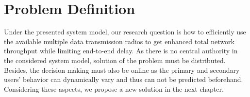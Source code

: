 \section{Problem Definition}

Under the presented system model, our research question is how to efficiently use the available multiple data transmission radios to get enhanced total network throughput while limiting end-to-end delay. As there is no central authority in the considered system model, solution of the problem must be distributed. Besides, the decision making must also be online as the primary and secondary users' behavior can dynamically vary and thus can not be predicted beforehand. Considering these aspects, we propose a new solution in the next chapter.
\endinput
